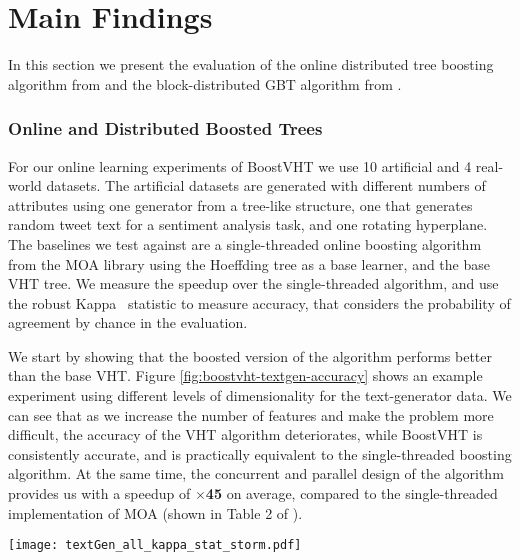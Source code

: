 \section{Main Findings}

In this section we present the evaluation of the online distributed tree boosting
algorithm from \boostvht and the block-distributed GBT algorithm from \blockgbt.

\subsubsection*{Online and Distributed Boosted Trees}
\label{sec:boostvht-results}

For our online learning experiments of BoostVHT we use 10 artificial and 4 real-world datasets. The artificial
datasets are generated with different numbers of attributes using one generator
from a tree-like structure, one that generates random tweet text for a sentiment
analysis task, and one rotating hyperplane. The baselines we test against are
a single-threaded online boosting algorithm from the MOA \cite{bifet2010moa}
library using the Hoeffding tree as a base learner, and the base VHT tree.
We measure the speedup over the single-threaded algorithm, and use the
robust Kappa~\cite{bifet2015efficient} statistic to measure accuracy,
that considers the probability of agreement by chance in the evaluation.

We start by showing that the boosted version of the algorithm performs
better than the base VHT. Figure \ref{fig:boostvht-textgen-accuracy} shows an example experiment using different
levels of dimensionality for the text-generator data. We can see
that as we increase the number of features and make the problem more
difficult, the accuracy of the VHT algorithm deteriorates, while
BoostVHT is consistently accurate, and is practically equivalent to the single-threaded
boosting algorithm. At the same time, the concurrent and parallel design of the algorithm
provides us with a speedup of \textbf{$\times$45} on average, compared to the single-threaded
implementation of MOA (shown in Table 2 of \boostvht).

\begin{figure*}
	\centering
	\texttt{[image: textGen\_all\_kappa\_stat\_storm.pdf]}
	\caption{Kappa statistic (accuracy) as a function of arriving instances over time for text generator datasets with
		an increasing number of attributes.}
	\label{fig:boostvht-textgen-accuracy}
\end{figure*}

